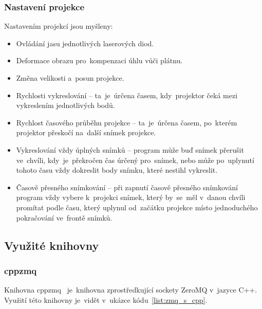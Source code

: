 \subsubsection{Nastavení projekce}
Nastavením projekcí jsou myšleny:
\begin{itemize}
\item Ovládání jasu jednotlivých laserových diod.
\item Deformace obrazu pro~kompenzaci úhlu vůči plátnu.
\item Změna velikosti a~posun projekce. 
\item Rychlosti vykreslování -- ta~je~úrčena časem, kdy~projektor čeká mezi vykreslením jednotlivých bodů.
\item Rychlost časového průběhu projekce -- ta~je~úrčena časem, po~kterém projektor přeskočí na~další snímek projekce.
\item Vykreslování vždy úplných snímků -- program může buď snímek přerušit ve~chvíli, kdy~je~překročen čas úrčený pro~snímek, nebo může po~uplynutí tohoto času vždy dokreslit body snímku, které nestihl vykreslit.
\item Časově přesného snímkování -- při zapnutí časově přesného snímkování program vždy vybere k~projekci snímek, který by~se~měl v~danou chvíli promítat podle času, který uplynul od~začátku projekce místo jednoduchého pokračování ve~frontě snímků.
\end{itemize}


\subsection{Využité knihovny}
\subsubsection{cppzmq}\label{sec:ls_cppzmq}
Knihovna cppzmq~\cite{cppzmq} je~knihovna zprostředkující sockety ZeroMQ v~jazyce C++. Využití této knihovny je~vidět v~ukázce kódu~\ref{list:zmq_s_cpp}.
\begin{code}
  \inputminted[frame=lines,fontsize=\footnotesize{}, linenos, breaklines]{cpp}{code_examples/zmq_server.cpp}
\end{code}

